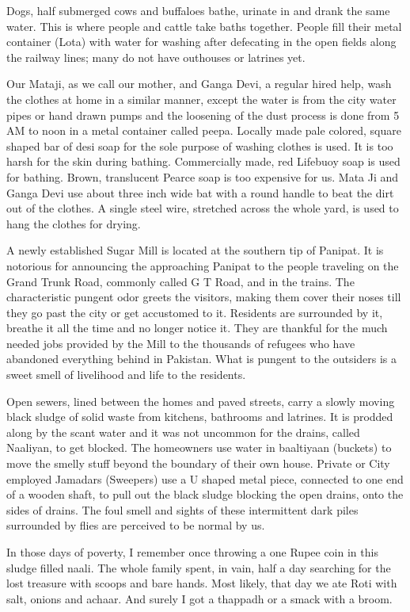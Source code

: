 Dogs, half submerged cows and buffaloes bathe, urinate in and drank the
same water. This is where people and cattle take baths together. People
fill their metal container (Lota) with water for washing after defecating
in the open fields along the railway lines; many do not have outhouses or
latrines yet. 

Our Mataji, as we call our mother, and Ganga Devi, a regular hired help,
wash the clothes at home in a similar manner, except the water is from the
city water pipes or hand drawn pumps and the loosening of the dust process
is done from 5 AM to noon in a metal container called peepa. Locally made
pale colored, square shaped bar of desi soap for the sole purpose of
washing clothes is used. It is too harsh for the skin during bathing.
Commercially made, red Lifebuoy soap is used for bathing. Brown,
translucent Pearce soap is too expensive for us. Mata Ji and Ganga Devi
use about three inch wide bat with a round handle to beat the dirt out of
the clothes. A single steel wire, stretched across the whole yard, is used
to hang the clothes for drying. 

A newly established Sugar Mill is located at the southern tip of Panipat.
It is notorious for announcing the approaching Panipat to the people
traveling on the Grand Trunk Road, commonly called G T Road, and in the
trains. The characteristic pungent odor greets the visitors, making them
cover their noses till they go past the city or get accustomed to it.
Residents are surrounded by it, breathe it all the time and no longer
notice it. They are thankful for the much needed jobs provided by the Mill
to the thousands of refugees who have abandoned everything behind in
Pakistan. What is pungent to the outsiders is a sweet smell of livelihood
and life to the residents. 

Open sewers, lined between the homes and paved streets, carry a slowly
moving black sludge of solid waste from kitchens, bathrooms and latrines.
It is prodded along by the scant water and it was not uncommon for the
drains, called Naaliyan, to get blocked. The homeowners use water in
baaltiyaan (buckets) to move the smelly stuff beyond the boundary of their
own house. Private or City employed Jamadars (Sweepers) use a U shaped
metal piece, connected to one end of a wooden shaft, to pull out the black
sludge blocking the open drains, onto the sides of drains. The foul smell
and sights of these intermittent dark piles surrounded by flies are
perceived to be normal by us. 

In those days of poverty, I remember once throwing a one Rupee coin in
this sludge filled naali. The whole family spent, in vain, half a day
searching for the lost treasure with scoops and bare hands. Most likely,
that day we ate Roti with salt, onions and achaar. And surely I got
a thappadh or a smack with a broom. 

